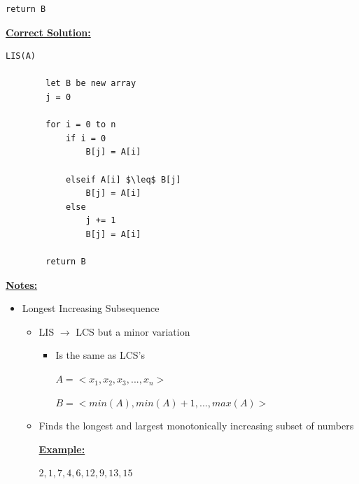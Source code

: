 \documentclass[12pt]{article}
\begin{document}
\begin{enumerate}[1.]
\begin{lstlisting}[mathescape=true]
        return B
    \end{lstlisting}

    \bigskip

    \begin{mdframed}
        \underline{\textbf{Correct Solution:}}

        \bigskip

    \begin{lstlisting}[mathescape=true]
    LIS(A)

        let B be new array
        j = 0

        for i = 0 to n
            if i = 0
                B[j] = A[i]

            elseif A[i] $\leq$ B[j]
                B[j] = A[i]
            else
                j += 1
                B[j] = A[i]

        return B
    \end{lstlisting}
    \end{mdframed}

    \bigskip

    \underline{\textbf{Notes:}}

    \bigskip

    \begin{itemize}
        \item Longest Increasing Subsequence

        \begin{itemize}
            \item LIS $\to$ LCS but a minor variation

            \begin{itemize}
                \item Is the same as LCS's

                $A = <x_1, x_2, x_3, ..., x_n>$

                $B = <min(A), min(A) + 1, ... , max(A)>$
            \end{itemize}
            \item Finds the longest and largest monotonically increasing subset of numbers

            \bigskip

            \underline{\textbf{Example:}}

            \bigskip

            $2,1,7,4,6,12,9,13,15$

            \bigskip


\end{itemize}
\end{itemize}
\end{enumerate}
\end{document}
